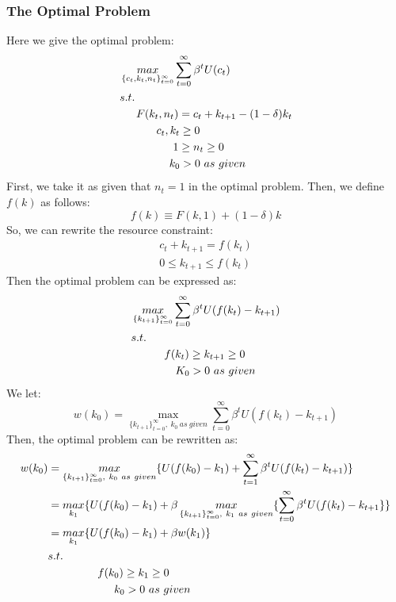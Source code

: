 \documentclass{article}
\begin{document}
\subsubsection{The Optimal Problem}
Here we give the optimal problem:
\begin{align*}
	&\mathop{max}\limits_{\{c_t, k_t, n_t\}^\infty_{t=0}} \sum\limits^\infty_{t=0} \beta^t U(c_t)\\
	&s.t.\\
	&\indent F(k_t, n_t) = c_t + k_{t+1} - (1 - \delta)k_t\\
	&\indent \indent \ c_t, k_t \geq 0\\
	&\indent \indent \indent \ 1 \geq n_t \geq 0\\
	&\indent \indent \indent k_0 > 0\ as\ given
\end{align*}
First, we take it as given that $n_t = 1$ in the optimal problem. Then, we define $f(k)$ as follows:
\begin{equation*}
	f(k) \equiv F(k, 1) + (1 - \delta)k
\end{equation*}
So, we can rewrite the resource constraint:
\begin{align*}
	c_t + k_{t+1} = f(k_t)\\
	0 \leq k_{t+1} \leq f(k_t)
\end{align*}
Then the optimal problem can be expressed as:
\begin{align*}
	&\mathop{max}\limits_{\{k_{t+1}\}^\infty_{t=0}} \sum\limits^\infty_{t=0} \beta^t U(f(k_t) - k_{t+1})\\
	&s.t.\\
	&\indent \indent f(k_t) \geq k_{t+1} \geq 0\\
	&\indent \indent \ \ \ K_0 > 0\ as\ given 
\end{align*}
We let:
\begin{equation*}
	w(k_0) = \mathop{max}\limits_{\{k_{t+1}\}^\infty_{t=0},\ k_0\ as\ given} \sum\limits^\infty_{t=0} \beta^t U(f(k_t) - k_{t+1})
\end{equation*}
Then, the optimal problem can be rewritten as:
\begin{align*}
	w(k_0) &= \mathop{max}\limits_{\{k_{t+1}\}^\infty_{t=0},\ k_0\ as\ given} \{ U(f(k_0) - k_1) + \sum\limits^\infty_{t=1} \beta^t U(f(k_t) - k_{t+1})\}\\
	&= \mathop{max}\limits_{k_1} \{U(f(k_0) - k_1) + \beta \mathop{max}\limits_{\{k_{t+1}\}^\infty_{t=0},\ k_1\ as\ given} \{\sum\limits^\infty_{t=0} \beta^t U(f(k_t) - k_{t+1}\}\}\\
	&= \mathop{max}\limits_{k_1} \{U(f(k_0) - k_1) + \beta w(k_1)\}\\
	&s.t.\\
	&\indent \indent \indent f(k_0) \geq k_1 \geq 0\\
	&\indent \indent \indent \indent k_0 > 0\ as\ given
\end{align*}
\end{document}
